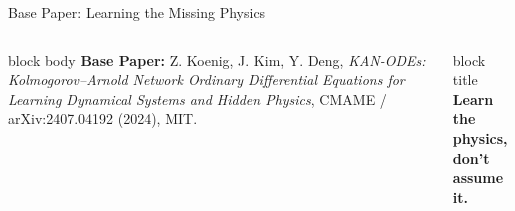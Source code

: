 \documentclass[aspectratio=169,10pt]{beamer}
\begin{document}
\begin{frame}{Base Paper: Learning the Missing Physics}
  \vspace{0.8em}
  \begin{columns}[T,onlytextwidth]
      \begin{beamercolorbox}[rounded=true,sep=0.55em]{block body}
        \scriptsize
        \textbf{Base Paper:} Z. Koenig, J. Kim, Y. Deng, \emph{KAN-ODEs: Kolmogorov--Arnold Network Ordinary Differential Equations for Learning Dynamical Systems and Hidden Physics}, CMAME / arXiv:2407.04192 (2024), MIT.
      \end{beamercolorbox}
      \begin{beamercolorbox}[rounded=true,center,sep=0.6em]{block title}
        \alert{\textbf{Learn the physics,}}\\[0.15em]
        \textbf{don't assume it.}
      \end{beamercolorbox}
  \end{columns}
\end{frame}
\end{document}
